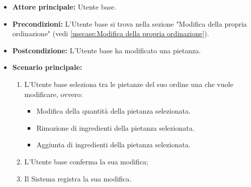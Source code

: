 \label{usecase:Modifica pietanza}
\begin{itemize}
	\item \textbf{Attore principale:} Utente base.

	\item \textbf{Precondizioni:}  L'Utente base si trova nella sezione "Modifica della propria ordinazione" (vedi \autoref{usecase:Modifica della propria ordinazione}).


	\item \textbf{Postcondizione:} L'Utente base ha modificato una pietanza.

	\item \textbf{Scenario principale:}
	      \begin{enumerate}
		      \item L'Utente base seleziona tra le pietanze del suo ordine una che vuole modificare, ovvero:
		            \begin{itemize}
			            \item Modifica della quantità della pietanza selezionata.
			            \item Rimozione di ingredienti della pietanza selezionata.
			            \item Aggiunta di ingredienti della pietanza selezionata.
		            \end{itemize}
		      \item L'Utente base conferma la sua modifica;
		      \item Il Sistema registra la sua modifica.
	      \end{enumerate}
\end{itemize}